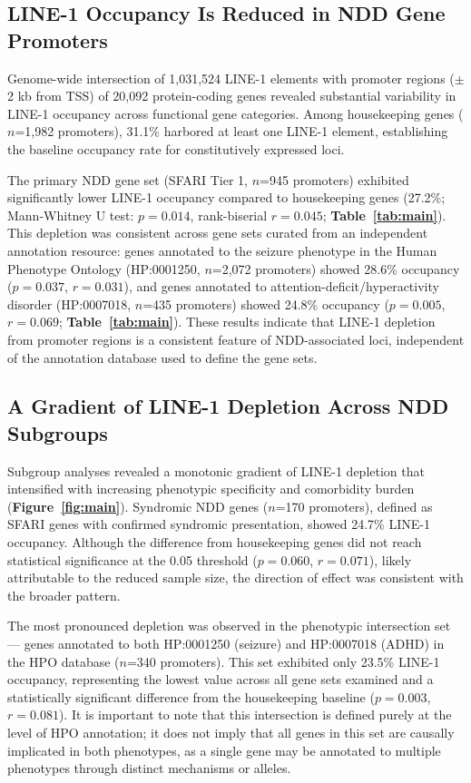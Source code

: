 \documentclass[11pt, a4paper]{article}
\newcommand{\Fig}[1]{\textbf{Figure~\ref{#1}}}
\newcommand{\Tab}[1]{\textbf{Table~\ref{#1}}}
\begin{document}
\subsection*{LINE-1 Occupancy Is Reduced in NDD Gene Promoters}

Genome-wide intersection of 1,031,524 LINE-1 elements with
promoter regions ($\pm$2 kb from TSS) of 20,092 protein-coding
genes revealed substantial variability in LINE-1 occupancy
across functional gene categories. Among housekeeping genes
($n$=1,982 promoters), 31.1\% harbored at least one LINE-1
element, establishing the baseline occupancy rate for
constitutively expressed loci.

The primary NDD gene set (SFARI Tier 1, $n$=945 promoters)
exhibited significantly lower LINE-1 occupancy compared to
housekeeping genes (27.2\%; Mann-Whitney U test: $p = 0.014$,
rank-biserial $r = 0.045$; \Tab{tab:main}).
This depletion was
consistent across gene sets curated from an independent
annotation resource: genes annotated to the seizure phenotype
in the Human Phenotype Ontology (HP:0001250, $n$=2,072
promoters) showed 28.6\% occupancy ($p = 0.037$, $r = 0.031$),
and genes annotated to attention-deficit/hyperactivity
disorder (HP:0007018, $n$=435 promoters) showed 24.8\%
occupancy ($p = 0.005$, $r = 0.069$; \Tab{tab:main}).
These results indicate that LINE-1 depletion from promoter
regions is a consistent feature of NDD-associated loci,
independent of the annotation database used to define the
gene sets.

\subsection*{A Gradient of LINE-1 Depletion Across NDD Subgroups}

Subgroup analyses revealed a monotonic gradient of LINE-1
depletion that intensified with increasing phenotypic
specificity and comorbidity burden (\Fig{fig:main}).
Syndromic NDD genes ($n$=170 promoters), defined as SFARI
genes with confirmed syndromic presentation, showed 24.7\%
LINE-1 occupancy. Although the difference from housekeeping
genes did not reach statistical significance at the 0.05
threshold ($p = 0.060$, $r = 0.071$), likely attributable to
the reduced sample size, the direction of effect was
consistent with the broader pattern.

The most pronounced depletion was observed in the phenotypic
intersection set --- genes annotated to both HP:0001250
(seizure) and HP:0007018 (ADHD) in the HPO database
($n$=340 promoters). This set exhibited only 23.5\% LINE-1
occupancy, representing the lowest value across all gene sets
examined and a statistically significant difference from the
housekeeping baseline ($p = 0.003$, $r = 0.081$). It is important
to note that this intersection is defined purely at the level
of HPO annotation; it does not imply that all genes in this
set are causally implicated in both phenotypes, as a single
gene may be annotated to multiple phenotypes through distinct
mechanisms or alleles.
\end{document}
